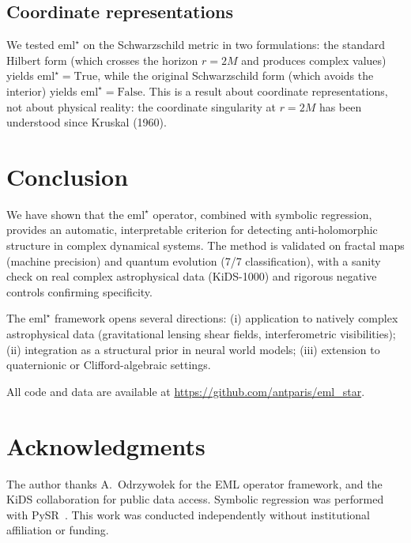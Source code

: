 \documentclass[12pt,a4paper]{article}
\newcommand{\emlstar}{\mathrm{eml}^{\star}}
\begin{document}
\subsection{Coordinate representations}

We tested $\emlstar$ on the Schwarzschild metric in two formulations:
the standard Hilbert form (which crosses the horizon $r = 2M$ and
produces complex values) yields $\emlstar = \mathrm{True}$,
while the original Schwarzschild form (which avoids the interior)
yields $\emlstar = \mathrm{False}$.
This is a result about coordinate representations, not about
physical reality: the coordinate singularity at $r = 2M$ has been
understood since Kruskal (1960).


\section{Conclusion}
\label{sec:conclusion}

We have shown that the $\emlstar$ operator, combined with symbolic
regression, provides an automatic, interpretable criterion for
detecting anti-holomorphic structure in complex dynamical systems.
The method is validated on fractal maps (machine precision)
and quantum evolution (7/7 classification), with a sanity check
on real complex astrophysical data (KiDS-1000) and rigorous
negative controls confirming specificity.

The $\emlstar$ framework opens several directions:
(i) application to natively complex astrophysical data
(gravitational lensing shear fields, interferometric visibilities);
(ii) integration as a structural prior in neural world models;
(iii) extension to quaternionic or Clifford-algebraic settings.

All code and data are available at
\url{https://github.com/antparis/eml_star}.


\section*{Acknowledgments}

The author thanks A.~Odrzywołek for the EML operator framework,
and the KiDS collaboration for public data access.
Symbolic regression was performed with
PySR~\citep{cranmer2023pysr}.
This work was conducted independently without institutional
affiliation or funding.
\end{document}
